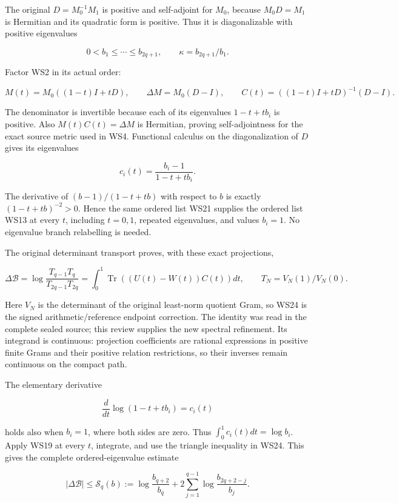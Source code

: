 The original \(D=M_0^{-1}M_1\) is positive and self-adjoint for \(M_0\), because \(M_0D=M_1\) is Hermitian and its quadratic form is positive. Thus it is diagonalizable with positive eigenvalues

\[
0<b_1\le\cdots\le b_{2q+1},
\qquad\kappa=b_{2q+1}/b_1.
\tag{WS21}
\]

Factor WS2 in its actual order:

\[
M(t)=M_0((1-t)I+tD),
\qquad\Delta M=M_0(D-I),
\qquad
C(t)=((1-t)I+tD)^{-1}(D-I).
\tag{WS22}
\]

The denominator is invertible because each of its eigenvalues \(1-t+tb_i\) is positive. Also \(M(t)C(t)=\Delta M\) is Hermitian, proving self-adjointness for the exact source metric used in WS4. Functional calculus on the diagonalization of \(D\) gives its eigenvalues

\[
c_i(t)=\frac{b_i-1}{1-t+tb_i}.
\tag{WS23}
\]

The derivative of \((b-1)/(1-t+tb)\) with respect to \(b\) is exactly \((1-t+tb)^{-2}>0\). Hence the same ordered list WS21 supplies the ordered list WS13 at every \(t\), including \(t=0,1\), repeated eigenvalues, and values \(b_i=1\). No eigenvalue branch relabelling is needed.

The original determinant transport proves, with these exact projections,

\[
\Delta\mathcal B
=\log\frac{T_{q-1}T_q}{T_{2q-1}T_{2q}}
=\int_0^1\operatorname{Tr}((U(t)-W(t))C(t))dt,
\qquad T_N=V_N(1)/V_N(0).
\tag{WS24}
\]

Here \(V_N\) is the determinant of the original least-norm quotient Gram, so WS24 is the signed arithmetic/reference endpoint correction. The identity was read in the complete sealed source; this review supplies the new spectral refinement. Its integrand is continuous: projection coefficients are rational expressions in positive finite Grams and their positive relation restrictions, so their inverses remain continuous on the compact path.

The elementary derivative

\[
\frac{d}{dt}\log(1-t+tb_i)=c_i(t)
\]

holds also when \(b_i=1\), where both sides are zero. Thus \(\int_0^1c_i(t)dt=\log b_i\). Apply WS19 at every \(t\), integrate, and use the triangle inequality in WS24. This gives the complete ordered-eigenvalue estimate

\[
\boxed{
|\Delta\mathcal B|
\le\mathscr S_q(b)
:=\log\frac{b_{q+2}}{b_q}
 +2\sum_{j=1}^{q-1}\log\frac{b_{2q+2-j}}{b_j}.
}
\tag{WS25}
\]


